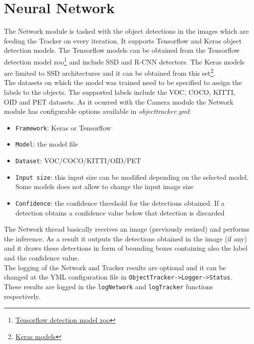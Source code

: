 \section{Neural Network}\label{neural_networks}
The Network module is tasked with the object detections in the images which are feeding the Tracker on every iteration. It supports Tensorflow and Keras object detection models. The Tensorflow models can be obtained from the Tensorflow detection model zoo\footnote{\href {https://github.com/tensorflow/models/blob/master/research/object_detection/g3doc/detection_model_zoo.md}{Tensorflow detection model zoo}} and include SSD and R-CNN detectors. The Keras models are limited to SSD architectures and it can be obtained from this set\footnote{\href {https://github.com/pierluigiferrari/ssd_keras#download-the-original-trained-model-weights}{Keras models}}.\\
The datasets on which the model was trained need to be specified to assign the labels to the objects. The supported labels include the VOC, COCO, KITTI, OID and PET datasets. As it ocurred with the Camera module the Network module has configurable options available in \textit{objecttracker.yml}:
\begin{itemize}
    \item \texttt{Framework}: Keras or Tensorflow
    \item \texttt{Model}: the model file
    \item \texttt{Dataset}: VOC/COCO/KITTI/OID/PET
    \item \texttt{Input size}: this input size can be modified depending on the selected model. Some models does not allow to change the input image size
    \item \texttt{Confidence}: the confidence threshold for the detections obtained. If a detection obtains a confidence value below that detection is discarded
\end{itemize}
The Network thread basically receives an image (previously resized) and performs the inference. As a result it outputs the detections obtained in the image (if any) and it draws these detections in form of bounding boxes containing also the label and the confidence value.\\
The logging of the Network and Tracker results are optional and it can be changed at the YML configuration file in \texttt{ObjectTracker->Logger->Status}. These results are logged in the \texttt{logNetwork} and \texttt{logTracker} functions respectively.\\

